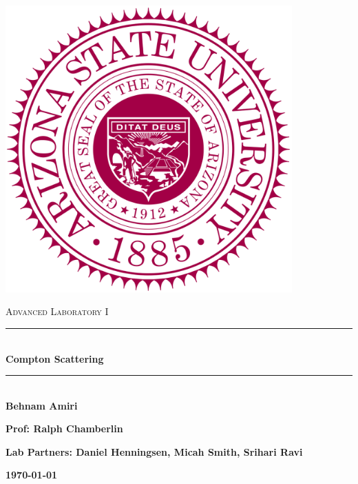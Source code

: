 \documentclass[fleqn]{article}
\begin{document}
  \begin{titlepage}

    \newcommand{\HRule}{\rule{\linewidth}{0.5mm}}

    \center

    \begin{center}
      \includegraphics[height=11cm, width=11cm]{asu.png}
    \end{center}

    \vline

    \textsc{\LARGE Advanced Laboratory I}\\[1.5cm]

    \HRule \\[0.5cm]
    { \huge \bfseries Compton Scattering}\\[0.4cm] 
    \HRule \\[1.0cm]

    \textbf{Behnam Amiri}

    \bigbreak

    \textbf{Prof: Ralph Chamberlin}

    \bigbreak

    \textbf{Lab Partners: Daniel Henningsen, Micah Smith, Srihari Ravi}

    \bigbreak

    \textbf{{\large \today}\\[2cm]}

    \vfill

  \end{titlepage}
\end{document}
